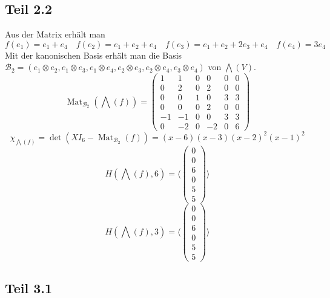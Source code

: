 \documentclass[10pt,a4paper]{article}
\DeclareMathOperator{\Mat}{Mat}
\begin{document}
\subsection*{Teil 2.2}

Aus der Matrix erhält man
\begin{equation}
f(e_{1}) = e_{1} + e_{4} \quad f(e_{2}) = e_{1} + e_{2} + e_{4} \quad f(e_{3}) = e_{1} + e_{2} + 2e_{3} + e_{4} \quad f(e_{4}) = 3e_{4}
\end{equation}
Mit der kanonischen Basis erhält man die Basis $\mathcal{B}_{2} = (e_{1} \otimes e_{2}, e_{1} \otimes e_{3}, e_{1} \otimes e_{4}, e_{2} \otimes e_{3}, e_{2} \otimes e_{4}, e_{3} \otimes e_{4})$ von $\bigwedge(V)$.
\begin{equation}
\Mat_{\mathcal{B}_{2}}(\bigwedge(f)) = \begin{pmatrix}
1 & 1 & 0 & 0 & 0 & 0\\
0 & 2 & 0 & 2 & 0 & 0\\
0 & 0 & 1 & 0 & 3 & 3\\
0 & 0 & 0 & 2 & 0 & 0\\
-1 & -1 & 0 & 0 & 3 & 3\\
0 & -2 & 0 & -2 & 0 & 6
\end{pmatrix}
\end{equation}
\begin{equation}
\chi_{\bigwedge(f)} = \det(XI_{6} - \Mat_{\mathcal{B}_{2}}(f)) = (x - 6)(x - 3)(x - 2)^{2}(x - 1)^{2}
\end{equation}
\begin{equation}
H(\bigwedge(f), 6) = \langle
\begin{pmatrix}
0\\0\\6\\0\\5\\5
\end{pmatrix}
\rangle
\end{equation}
\begin{equation}
H(\bigwedge(f), 3) = \langle
\begin{pmatrix}
0\\0\\6\\0\\5\\5
\end{pmatrix}
\rangle
\end{equation}

\subsection*{Teil 3.1}
\end{document}
